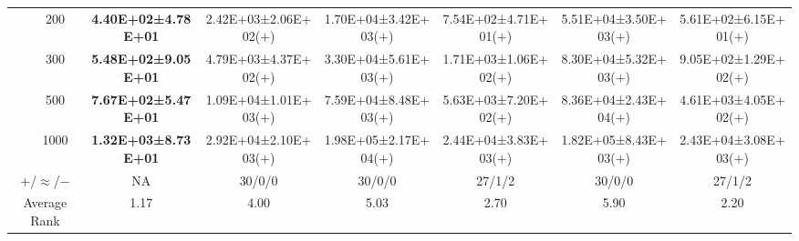 \begin{tabular}{|cc|c|c|c|c|c|c|}
\multicolumn{1}{|c|}{}                            & 200       & \textbf{4.40E+02±4.78E+01} & 2.42E+03±2.06E+02($+$) & 1.70E+04±3.42E+03($+$) & 7.54E+02±4.71E+01($+$)                & 5.51E+04±3.50E+03($+$) & 5.61E+02±6.15E+01($+$)          \\ \cline{2-8} 
\multicolumn{1}{|c|}{}                            & 300       & \textbf{5.48E+02±9.05E+01} & 4.79E+03±4.37E+02($+$) & 3.30E+04±5.61E+03($+$) & 1.71E+03±1.06E+02($+$)                & 8.30E+04±5.32E+03($+$) & 9.05E+02±1.29E+02($+$)          \\ \cline{2-8} 
\multicolumn{1}{|c|}{}                            & 500       & \textbf{7.67E+02±5.47E+01} & 1.09E+04±1.01E+03($+$) & 7.59E+04±8.48E+03($+$) & 5.63E+03±7.20E+02($+$)                & 8.36E+04±2.43E+04($+$) & 4.61E+03±4.05E+02($+$)          \\ \cline{2-8} 
\multicolumn{1}{|c|}{}                            & 1000      & \textbf{1.32E+03±8.73E+01} & 2.92E+04±2.10E+03($+$) & 1.98E+05±2.17E+04($+$) & 2.44E+04±3.83E+03($+$)                & 1.82E+05±8.43E+03($+$) & 2.43E+04±3.08E+03($+$)          \\ \hline
\multicolumn{2}{|c|}{$+$/$\approx$/$-$}                       & NA                         & 30/0/0                 & 30/0/0                 & 27/1/2                                & 30/0/0                 & 27/1/2                          \\ \hline
\multicolumn{2}{|c|}{Average Rank}                            & 1.17                       & 4.00                   & 5.03                   & 2.70                                  & 5.90                   & 2.20                            \\ \hline
\end{tabular}
